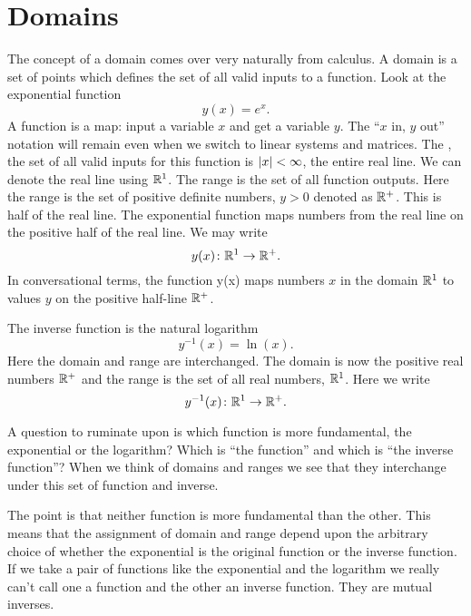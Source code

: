 \section{Domains}
The concept of a domain comes over very naturally from calculus. A domain is a set of points which defines the set of all valid inputs to a function. Look at the exponential function
\begin{equation}
  y(x) = e^{x}.
\end{equation}
A function is a map: input a variable $x$ and get a variable $y$. The ``$x$ in, $y$ out'' notation will remain even when we switch to linear systems and matrices.
The , the set of all valid inputs for this function is $\left|x\right|<\infty$, the entire real line. We can denote the real line using $\mathbb{R}^{1}$. The range is the set of all function outputs. Here the range is the set of positive definite numbers, $y>0$ denoted as $\mathbb{R}^{+}$. This is half of the real line. The exponential function maps numbers from the real line on the positive half of the real line. We may write
\begin{equation}
  y(x)\colon\mathbb{R}^{1}\to\mathbb{R}^{+}.
\end{equation}
In conversational terms, the function y(x) maps numbers $x$ in the domain $\mathbb{R}^{1}$ to values $y$ on the positive half-line $\mathbb{R}^{+}$.


The inverse function is the natural logarithm
\begin{equation}
  y^{-1}(x) = \ln (x).
\end{equation}
Here the domain and range are interchanged. The domain is now the positive real numbers $\mathbb{R}^{+}$ and the range is the set of all real numbers, $\mathbb{R}^{1}$. Here we write
\begin{equation}
  y^{-1}(x)\colon\mathbb{R}^{1}\to\mathbb{R}^{+}.
\end{equation}

A question to ruminate upon is which function is more fundamental, the exponential or the logarithm? Which is ``the function'' and which is ``the inverse function''? When we think of domains and ranges we see that they interchange under this set of function and inverse. 

The point is that neither function is more fundamental than the other. This means that the assignment of domain and range depend upon the arbitrary choice of whether the exponential is the original function or the inverse function. If we take a pair of functions like the exponential and the logarithm we really can't call one a function and the other an inverse function. They are mutual inverses.

